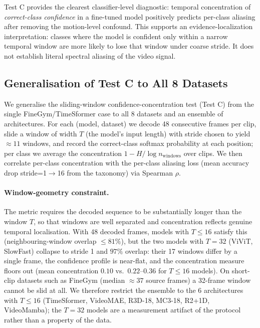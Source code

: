 \documentclass[runningheads]{llncs}
\begin{document}
Test C provides the clearest classifier-level diagnostic: temporal concentration of \emph{correct-class confidence} in a fine-tuned model positively predicts per-class aliasing after removing the motion-level confound. This supports an evidence-localization interpretation: classes where the model is confident only within a narrow temporal window are more likely to lose that window under coarse stride. It does not establish literal spectral aliasing of the video signal.

\subsection*{Generalisation of Test C to All 8 Datasets}
\label{sec:sup_sw_generalisation}

We generalise the sliding-window confidence-concentration test (Test C) from the single FineGym/TimeSformer case to all 8 datasets and an ensemble of architectures. For each (model, dataset) we decode 48 consecutive frames per clip, slide a window of width $T$ (the model's input length) with stride chosen to yield ${\approx}11$ windows, and record the correct-class softmax probability at each position; per class we average the concentration $1-H/\log n_\mathrm{windows}$ over clips. We then correlate per-class concentration with the per-class aliasing loss (mean accuracy drop stride=1$\to$16 from the taxonomy) via Spearman $\rho$.

\paragraph{Window-geometry constraint.} The metric requires the decoded sequence to be substantially longer than the window $T$, so that windows are well separated and concentration reflects genuine temporal localisation. With 48 decoded frames, models with $T\le16$ satisfy this (neighbouring-window overlap $\le81\%$), but the two models with $T=32$ (ViViT, SlowFast) collapse to stride 1 and $97\%$ overlap: their 17 windows differ by a single frame, the confidence profile is near-flat, and the concentration measure floors out (mean concentration $0.10$ vs.\ $0.22$--$0.36$ for $T\le16$ models). On short-clip datasets such as FineGym (median ${\approx}37$ source frames) a 32-frame window cannot be slid at all. We therefore restrict the ensemble to the 6 architectures with $T\le16$ (TimeSformer, VideoMAE, R3D-18, MC3-18, R2+1D, VideoMamba); the $T=32$ models are a measurement artifact of the protocol rather than a property of the data.
\end{document}
